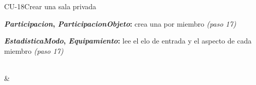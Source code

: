 \begin{fichacu}{CU-18}{Crear una sala privada}
{\begin{cudatos}
      \item \textbf{\textit{Participacion}, \textit{ParticipacionObjeto}:} crea una por miembro \textit{(paso 17)}
      \item \textbf{\textit{EstadisticaModo}, \textit{Equipamiento}:} lee el elo de entrada y el aspecto de cada miembro \textit{(paso 17)}
    \end{cudatos}} \\
   &  \\ \hline
\end{fichacu}
\clearpage
